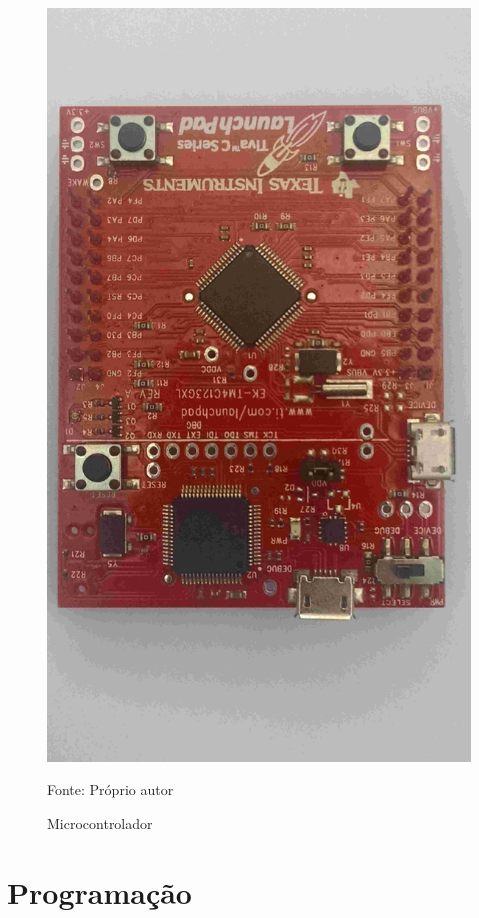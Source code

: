 \begin{figure}[!htb]
\caption{Microcontrolador}
\center\includegraphics[scale=0.1, angle=180, clip=true, trim=0 750 60 500]{./imagens/uC-ARM.jpg}
\label{fig:uCarm}

{\small Fonte: Próprio autor}
\end{figure}


\section{Programação}

